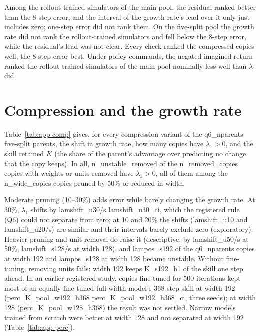 Among the rollout-trained simulators of the main pool, the residual ranked better than the 8-step error, and the
interval of the growth rate's lead over it only just includes zero; one-step error did not rank them. On the five-split pool the
growth rate did not rank the rollout-trained simulators and fell below the 8-step error, while the residual's lead was
not clear. Every check ranked the compressed copies well, the 8-step error best. Under policy commands, the negated
imagined return ranked the rollout-trained simulators of the main pool nominally less well than $\lambda_1$ did.

\FloatBarrier
\section{Compression and the growth rate}\label{app:A5}
Table~\ref{tab:app-comp} gives, for every compression variant of the {{q6_nparents}} five-split parents, the shift in
growth rate, how many copies have $\lambda_1>0$, and the skill retained $K$ (the share of the parent's advantage over
predicting no change that the copy keeps). In all, {{n_unstable_removed}} of the {{n_removed_copies}} copies with
weights or units removed have $\lambda_1>0$, all of them among the {{n_wide_copies}} copies pruned by 50\% or reduced in
width.

Moderate pruning (10--30\%) adds error while barely changing the growth rate. At 30\%, $\lambda_1$ shifts by
{{lamshift_u30}}/s {{lamshift_u30_ci}}, which the registered rule (Q6) could not separate from zero; at 10 and 20\%
the shifts ({{lamshift_u10}} and {{lamshift_u20}}/s) are similar and their intervals barely exclude zero
(exploratory). Heavier pruning and unit removal do raise it (descriptive: by {{lamshift_u50}}/s at 50\%,
{{lamshift_s128}}/s at width 128), and {{lampos_s192}} of the {{q6_nparents}} copies at width 192 and {{lampos_s128}}
at width 128 became unstable. Without fine-tuning, removing units fails: width 192 keeps {{K_s192_h1}} of the skill
one step ahead. In an earlier registered study, copies fine-tuned for 500 iterations kept most of an equally
fine-tuned full-width model's 368-step skill at width 192 ({{perc_K_pool_w192_h368}} {{perc_K_pool_w192_h368_ci}},
three seeds); at width 128 ({{perc_K_pool_w128_h368}}) the result was not settled. Narrow models trained from scratch
were better at width 128 and not separated at width 192 (Table~\ref{tab:app-perc}).

